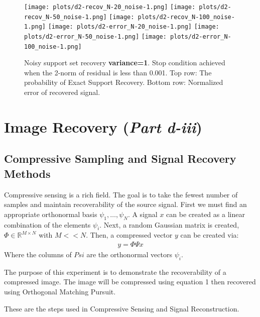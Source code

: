 \documentclass{article}
\begin{document}
\begin{figure}[h]
    \captionsetup{width=.75\linewidth}
    \centering
        \texttt{[image: plots/d2-recov\_N-20\_noise-1.png]}
        \texttt{[image: plots/d2-recov\_N-50\_noise-1.png]}
        \texttt{[image: plots/d2-recov\_N-100\_noise-1.png]}
        \newline
        \texttt{[image: plots/d2-error\_N-20\_noise-1.png]}
        \texttt{[image: plots/d2-error\_N-50\_noise-1.png]}
        \texttt{[image: plots/d2-error\_N-100\_noise-1.png]}
        \caption{Noisy support set recovery {\bf variance=1}. Stop condition achieved when the 2-norm of residual is less than 0.001. Top row: The probability of Exact Support Recovery. Bottom row: Normalized error of recovered signal.}
\end{figure}




\newpage
\section*{Image Recovery ({\it Part d-iii})}

\subsection*{Compressive Sampling and Signal Recovery Methods}

Compressive sensing is a rich field.
The goal is to take the fewest number of samples and maintain recoverability of the source signal.
First we must find an appropriate orthonormal basis ${\psi_1, \ldots, \psi_N}$.
A signal $x$ can be created as a linear combination of the elements $\psi_i$.
Next, a random Gaussian matrix is created, $\Phi \in \mathbb{R}^{M \times N}$ with $M<<N$.
Then, a compressed vector $y$ can be created via:
\begin{align}
    y = \Phi \Psi x
\end{align}
Where the columns of $Psi$ are the orthonormal vectors $\psi_i$.

The purpose of this experiment is to demonstrate the recoverability of a compressed image.
The image will be compressed using equation 1 then recovered using Orthogonal Matching Pursuit.


These are the steps used in Compressive Sensing and Signal Reconstruction.
\end{document}
